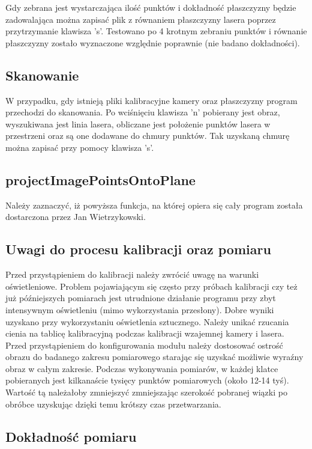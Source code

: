 \documentclass[conference]{IEEEtran}
\begin{document}
Gdy zebrana jest wystarczająca ilość punktów i dokładność płaszczyzny będzie zadowalająca można zapisać plik z równaniem płaszczyzny lasera poprzez przytrzymanie klawisza 's'.
Testowano po 4 krotnym zebraniu punktów i równanie płaszczyzny zostało wyznaczone względnie poprawnie (nie badano dokładności).

\subsection{Skanowanie}

W przypadku, gdy istnieją pliki kalibracyjne kamery oraz płaszczyzny program przechodzi do skanowania. Po wciśnięciu klawisza 'n' pobierany jest obraz, wyszukiwana jest linia lasera, obliczane jest położenie punktów lasera w przestrzeni oraz są one dodawane do chmury punktów. Tak uzyskaną chmurę można zapisać przy pomocy klawisza 's'.

\subsection{projectImagePointsOntoPlane}

Należy zaznaczyć, iż powyższa funkcja, na której opiera się cały program została dostarczona przez Jan Wietrzykowski.

\subsection{Uwagi do procesu kalibracji oraz pomiaru}

Przed przystąpieniem do kalibracji należy zwrócić uwagę na warunki oświetleniowe. Problem pojawiającym się często przy próbach kalibracji czy też już późniejszych pomiarach jest utrudnione działanie programu przy zbyt intensywnym oświetleniu (mimo wykorzystania przesłony). Dobre wyniki uzyskano przy wykorzystaniu oświetlenia sztucznego. Należy unikać rzucania cienia na tablicę kalibracyjną podczas kalibracji wzajemnej kamery i lasera. Przed przystąpieniem do konfigurowania modułu należy dostosować ostrość obrazu do badanego zakresu pomiarowego starając się uzyskać możliwie wyraźny obraz w całym zakresie. Podczas wykonywania pomiarów, w każdej klatce pobieranych jest kilkanaście tysięcy punktów pomiarowych (około 12-14 tyś). Wartość tą należałoby zmniejszyć zmniejszając szerokość pobranej wiązki po obróbce uzyskując dzięki temu krótszy czas przetwarzania.


\subsection{Dokładność pomiaru}
\end{document}
